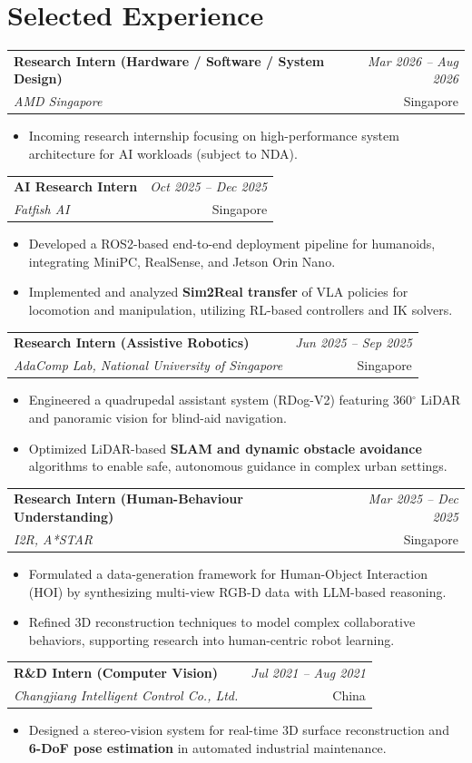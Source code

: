 \documentclass[11pt]{article}
\makeatletter
\newenvironment{cvitems}{%
  \setlength{\parskip}{0pt}%
\begin{itemize}[leftmargin=*, itemsep=0.1em, topsep=0em, partopsep=0em, parsep=0pt]}{
  \end{itemize}}
\newcommand{\cventry}[4]{%
  \noindent
  \begin{tabular*}{\textwidth}{@{}p{0.75\textwidth}@{\extracolsep{\fill}}r@{}}
    \textbf{#1} & \textit{#4} \\
    \textit{#2} & #3 \\
  \end{tabular*}
  \vspace{-0.4em}
}
\makeatother
\begin{document}
\section{Selected Experience}

\cventry{Research Intern (Hardware / Software / System Design)}{AMD Singapore}{Singapore}{Mar 2026 -- Aug 2026}
\begin{cvitems}
  \item Incoming research internship focusing on high-performance system architecture for AI workloads (subject to NDA).
\end{cvitems}

\cventry{AI Research Intern}{Fatfish AI}{Singapore}{Oct 2025 -- Dec 2025}
\begin{cvitems}
\item Developed a ROS2-based end-to-end deployment pipeline for humanoids, integrating MiniPC, RealSense, and Jetson Orin Nano.
\item Implemented and analyzed \textbf{Sim2Real transfer} of VLA policies for locomotion and manipulation, utilizing RL-based controllers and IK solvers.
\end{cvitems}

\cventry{Research Intern (Assistive Robotics)}{AdaComp Lab, National University of Singapore}{Singapore}{Jun 2025 -- Sep 2025}
\begin{cvitems}
\item Engineered a quadrupedal assistant system (RDog-V2) featuring 360$^\circ$ LiDAR and panoramic vision for blind-aid navigation.
\item Optimized LiDAR-based \textbf{SLAM and dynamic obstacle avoidance} algorithms to enable safe, autonomous guidance in complex urban settings.
\end{cvitems}

\cventry{Research Intern (Human-Behaviour Understanding)}{I2R, A*STAR}{Singapore}{Mar 2025 -- Dec 2025}
\begin{cvitems}
\item Formulated a data-generation framework for Human-Object Interaction (HOI) by synthesizing multi-view RGB-D data with LLM-based reasoning.
\item Refined 3D reconstruction techniques to model complex collaborative behaviors, supporting research into human-centric robot learning.
\end{cvitems}

\cventry{R\&D Intern (Computer Vision)}{Changjiang Intelligent Control Co., Ltd.}{China}{Jul 2021 -- Aug 2021}
\begin{cvitems}
\item Designed a stereo-vision system for real-time 3D surface reconstruction and \textbf{6-DoF pose estimation} in automated industrial maintenance.
\end{cvitems}
\end{document}
